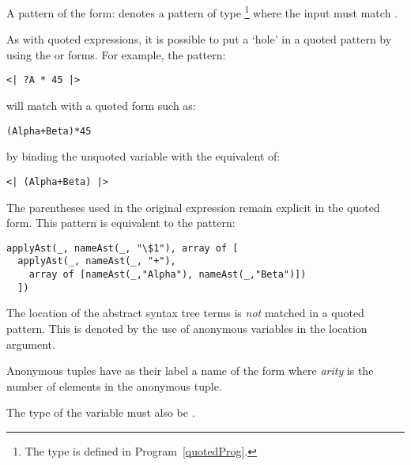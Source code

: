 A pattern of the form:
denotes a pattern of type \footnote{The  type is defined in Program~\vref{quotedProg}.} where the input must match .

As with quoted expressions, it is possible to put a `hole' in a quoted pattern by using the  or  forms. For example, the pattern:
\begin{lstlisting}
<| ?A * 45 |>
\end{lstlisting}
will match with a quoted form such as:
\begin{lstlisting}
(Alpha+Beta)*45
\end{lstlisting}
by binding the unquoted variable  with the equivalent of:
\begin{lstlisting}
<| (Alpha+Beta) |>
\end{lstlisting}
\begin{aside}
The parentheses used in the original expression remain explicit in the quoted form. This pattern is equivalent to the pattern:
\begin{lstlisting}
applyAst(_, nameAst(_, "\$1"), array of [
  applyAst(_, nameAst(_, "+"),
    array of [nameAst(_,"Alpha"), nameAst(_,"Beta")])
  ])
\end{lstlisting}
\begin{aside}
The location of the abstract syntax tree terms is \emph{not} matched in a quoted pattern. This is denoted by the use of anonymous variables in the location argument.
\end{aside}
\begin{aside}
Anonymous tuples have as their label a name of the form  where \emph{arity} is the number of elements in the anonymous tuple.
\end{aside}
\end{aside}
The type of the variable  must also be .

